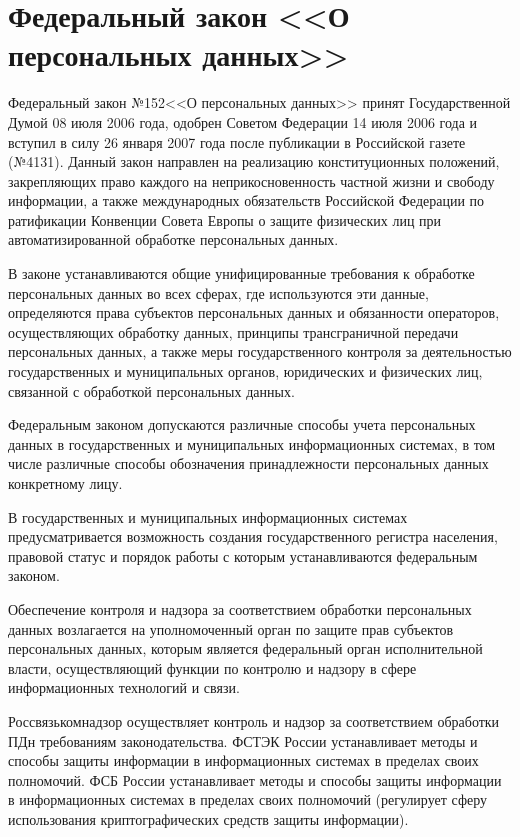 \section{Федеральный закон <<О персональных данных>>} \label{rights_152}

Федеральный закон №152 <<О персональных данных>> принят Государственной Думой 08 июля 2006 года, одобрен Советом Федерации 14 июля 2006 года и вступил в силу 26 января 2007 года после публикации в Российской газете (№4131). Данный закон направлен на реализацию конституционных положений, закрепляющих право каждого на неприкосновенность частной жизни и свободу информации, а также международных обязательств Российской Федерации по ратификации Конвенции Совета Европы о защите физических лиц при автоматизированной обработке персональных данных.

\vspace{\baselineskip}
В законе устанавливаются общие унифицированные требования к обработке персональных данных во всех сферах, где используются эти данные, определяются права субъектов персональных данных и обязанности операторов, осуществляющих обработку данных, принципы трансграничной передачи персональных данных, а также меры государственного контроля за деятельностью государственных и муниципальных органов, юридических и физических лиц, связанной с обработкой персональных данных.

\vspace{\baselineskip}
Федеральным законом допускаются различные способы учета персональных данных в государственных и муниципальных информационных системах, в том числе различные способы обозначения принадлежности персональных данных конкретному лицу.

В государственных и муниципальных информационных системах предусматривается возможность создания государственного регистра населения, правовой статус и порядок работы с которым устанавливаются федеральным законом.

Обеспечение контроля и надзора за соответствием обработки персональных данных возлагается на уполномоченный орган по защите прав субъектов персональных данных, которым является федеральный орган исполнительной власти, осуществляющий функции по контролю и надзору в сфере информационных технологий и связи.

\vspace{\baselineskip}
Россвязькомнадзор осуществляет контроль и надзор за соответствием обработки ПДн требованиям законодательства.
ФСТЭК России устанавливает методы и способы защиты информации в информационных системах в пределах своих полномочий.
ФСБ России устанавливает методы и способы защиты информации в информационных системах в пределах своих полномочий (регулирует сферу использования криптографических средств защиты информации).